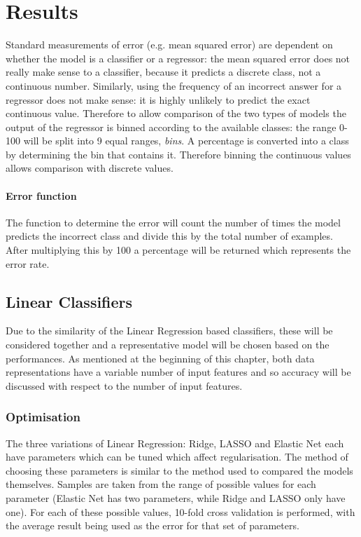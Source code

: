 \section{Results}
Standard measurements of error (e.g. mean squared error) are dependent on whether the model is a classifier or a regressor: the mean squared error does not really make sense to a classifier, because it predicts a discrete class, not a continuous number. Similarly, using the frequency of an incorrect answer for a regressor does not make sense: it is highly unlikely to predict the exact continuous value. Therefore to allow comparison of the two types of models the output of the regressor is binned according to the available classes: the range 0-100 will be split into 9 equal ranges, {\it bins}. A percentage is converted into a class by determining the bin that contains it. Therefore binning the continuous values allows comparison with discrete values.
\paragraph*{Error function}
The function to determine the error will count the number of times the model predicts the incorrect class and divide this by the total number of examples. After multiplying this by 100 a percentage will be returned which represents the error rate.

\subsection{Linear Classifiers}
Due to the similarity of the Linear Regression based classifiers, these will be considered together and a representative model will be chosen based on the performances. As mentioned at the beginning of this chapter, both data representations have a variable number of input features and so accuracy will be discussed with respect to the number of input features.

\subsubsection{Optimisation}
The three variations of Linear Regression: Ridge, LASSO and Elastic Net each have parameters which can be tuned which affect regularisation. The method of choosing these parameters is similar to the method used to compared the models themselves.
Samples are taken from the range of possible values for each parameter (Elastic Net has two parameters, while Ridge and LASSO only have one). For each of these possible values, 10-fold cross validation is performed, with the average result being used as the error for that set of parameters.

